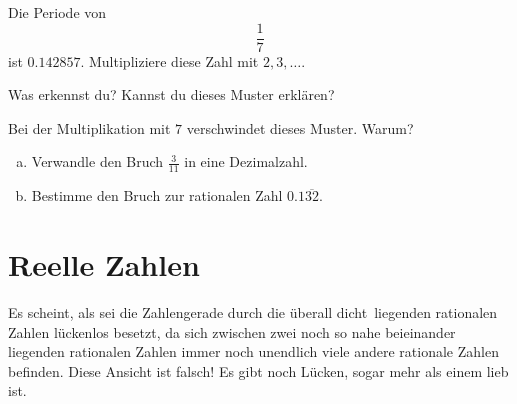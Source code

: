 \documentclass[%
11pt,%
twoside,%
titlepage,%
german,%
headsepline%
]{scrartcl}
\begin{document}
\begin{ueb}
Die Periode von
$$\frac{1}{7}$$
ist $0.142857$. Multipliziere diese Zahl mit $2,3,\dots$.
	\begin{enumeratea}
	  \item Was erkennst du? Kannst du dieses Muster erklären?
	  \item Bei der Multiplikation mit $7$ verschwindet dieses Muster. Warum?
	\end{enumeratea} 
\end{ueb}

\begin{ueb}

    \begin{enumerate}[a)]
        \item Verwandle den Bruch $\frac{3}{11}$ in eine Dezimalzahl.
        \item Bestimme den Bruch zur rationalen Zahl $0.1\overline{32}$.
    \end{enumerate}
\end{ueb}

\section{Reelle Zahlen}

Es scheint, als sei die Zahlengerade durch die \glqq überall dicht\grqq\
liegenden rationalen Zahlen lückenlos besetzt, da sich zwischen zwei
noch so nahe beieinander liegenden rationalen Zahlen immer noch unendlich viele andere rationale Zahlen befinden. Diese Ansicht ist
falsch! Es gibt noch Lücken, sogar mehr als einem lieb ist.
\end{document}
